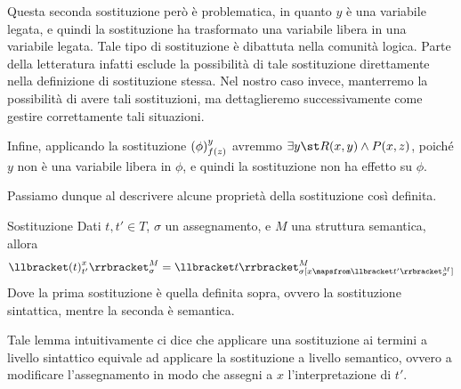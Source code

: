 Questa seconda sostituzione però è problematica, in quanto \(y\) è una variabile legata, e quindi la sostituzione ha trasformato una variabile libera in una variabile legata. Tale tipo di sostituzione è dibattuta nella comunità logica. Parte della letteratura infatti esclude la possibilità di tale sostituzione direttamente nella definizione di sostituzione stessa. Nel nostro caso invece, manterremo la possibilità di avere tali sostituzioni, ma dettaglieremo successivamente come gestire correttamente tali situazioni.

Infine, applicando la sostituzione \({{\left(\phi\right)}^{y}_{f(z)}}\) avremmo \(\exists y\st R(x,y) \land P(x,z)\), poiché \(y\) non è una variabile libera in \(\phi\), e quindi la sostituzione non ha effetto su \(\phi\).

Passiamo dunque al descrivere alcune proprietà della sostituzione così definita.

\begin{lemma}{Sostituzione}
  Dati \(t, t' \in T\), \(\sigma\) un assegnamento, e \(M\) una struttura semantica, allora
  \[\den{{\subs{t}{x}{t'}} }[M][\sigma] = \den{t}[M][\sigma[x \mapsfrom \den{t'}[M][\sigma]]]\]
  Dove la prima sostituzione è quella definita sopra, ovvero la sostituzione sintattica, mentre la seconda è semantica.
\end{lemma}

Tale lemma intuitivamente ci dice che applicare una sostituzione ai termini a livello sintattico equivale ad applicare la sostituzione a livello semantico, ovvero a modificare l'assegnamento in modo che assegni a \(x\) l'interpretazione di \(t'\).

